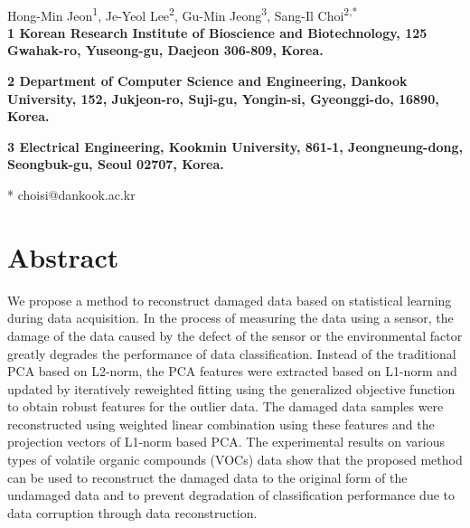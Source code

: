 \documentclass[10pt,letterpaper]{article}
\date{}
\begin{document}
\vspace*{0.2in}

\begin{flushleft}
{\Large
\textbf{} %
}
\newline
\\
Hong-Min Jeon\textsuperscript{1},
Je-Yeol Lee\textsuperscript{2},
Gu-Min Jeong\textsuperscript{3},
Sang-Il Choi\textsuperscript{2,*}
\\
\bigskip
\bf{1} Korean Research Institute of Bioscience and Biotechnology,
125 Gwahak-ro, Yuseong-gu, Daejeon 306-809, Korea.

\bf{2} Department of Computer Science and Engineering,
Dankook University, 152, Jukjeon-ro, Suji-gu, Yongin-si, Gyeonggi-do, 16890, Korea.

\bf{3} Electrical Engineering,
Kookmin University, 861-1, Jeongneung-dong, Seongbuk-gu, Seoul 02707, Korea.
\\
\bigskip

* choisi@dankook.ac.kr

\end{flushleft}
\section*{Abstract}

We propose a method to reconstruct damaged data based on statistical learning during data acquisition. In the process of measuring the data using a sensor, the damage of the data caused by the defect of the sensor or the environmental factor greatly degrades the performance of data classification. Instead of the traditional PCA based on L2-norm, the PCA features were extracted based on L1-norm and updated by iteratively reweighted fitting using the generalized objective function to obtain robust features for the outlier data. The damaged data samples were reconstructed using weighted linear combination using these features and the projection vectors of L1-norm based PCA. The experimental results on various types of volatile organic compounds (VOCs) data show that the proposed method can be used to reconstruct the damaged data to the original form of the undamaged data and to prevent degradation of classification performance due to data corruption through data reconstruction. 
\end{document}
